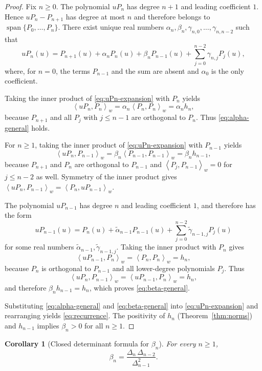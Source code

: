 \documentclass[11pt]{amsart}
\numberwithin{equation}{section}
\newtheorem{corollary}[theorem]{Corollary}
\theoremstyle{definition}
\newcommand{\DeltaH}[1]{\Delta_{#1}}
\newcommand{\inner}[2]{\left\langle #1,#2\right\rangle_{w}}
\begin{document}
\begin{proof}
Fix $n\ge 0$. The polynomial $uP_{n}$ has degree $n+1$ and leading coefficient
$1$. Hence $uP_{n}-P_{n+1}$ has degree at most $n$ and therefore belongs to
$\operatorname{span}\{P_{0},\dots,P_{n}\}$. There exist unique real numbers
$\alpha_{n},\beta_{n},\gamma_{n,0},\dots,\gamma_{n,n-2}$ such that
\begin{equation}\label{eq:uPn-expansion}
uP_{n}(u)=P_{n+1}(u)+\alpha_{n}P_{n}(u)
+\beta_{n}P_{n-1}(u)+\sum_{j=0}^{n-2}\gamma_{n,j}P_{j}(u),
\end{equation}
where, for $n=0$, the terms $P_{n-1}$ and the sum are absent and
$\alpha_{0}$ is the only coefficient.

Taking the inner product of \eqref{eq:uPn-expansion} with $P_{n}$ yields
\[
\inner{uP_{n}}{P_{n}}=\alpha_{n}\inner{P_{n}}{P_{n}}
=\alpha_{n}h_{n},
\]
because $P_{n+1}$ and all $P_{j}$ with $j\le n-1$ are orthogonal to $P_{n}$.
Thus \eqref{eq:alpha-general} holds.

For $n\ge 1$, taking the inner product of \eqref{eq:uPn-expansion} with
$P_{n-1}$ yields
\[
\inner{uP_{n}}{P_{n-1}}
=\beta_{n}\inner{P_{n-1}}{P_{n-1}}
=\beta_{n}h_{n-1},
\]
because $P_{n+1}$ and $P_{n}$ are orthogonal to $P_{n-1}$ and
$\inner{P_{j}}{P_{n-1}}=0$ for $j\le n-2$ as well. Symmetry of the inner
product gives $\inner{uP_{n}}{P_{n-1}}=\inner{P_{n}}{uP_{n-1}}$.

The polynomial $uP_{n-1}$ has degree $n$ and leading coefficient $1$, and
therefore has the form
\begin{equation}\label{eq:uPn-1}
uP_{n-1}(u)=P_{n}(u)+\widetilde{\alpha}_{n-1}P_{n-1}(u)
+\sum_{j=0}^{n-2}\widetilde{\gamma}_{n-1,j}P_{j}(u)
\end{equation}
for some real numbers $\widetilde{\alpha}_{n-1},\widetilde{\gamma}_{n-1,j}$.
Taking the inner product with $P_{n}$ gives
\[
\inner{uP_{n-1}}{P_{n}}=\inner{P_{n}}{P_{n}}=h_{n},
\]
because $P_{n}$ is orthogonal to $P_{n-1}$ and all lower-degree polynomials
$P_{j}$. Thus
\[
\inner{uP_{n}}{P_{n-1}}=\inner{uP_{n-1}}{P_{n}}=h_{n},
\]
and therefore $\beta_{n}h_{n-1}=h_{n}$, which proves \eqref{eq:beta-general}.

Substituting \eqref{eq:alpha-general} and \eqref{eq:beta-general} into
\eqref{eq:uPn-expansion} and rearranging yields \eqref{eq:recurrence}. The
positivity of $h_{n}$ (Theorem~\ref{thm:norms}) and $h_{n-1}$ implies
$\beta_{n}>0$ for all $n\ge 1$.
\end{proof}

\begin{corollary}[Closed determinant formula for $\beta_{n}$]\label{cor:beta-det}
For every $n\ge 1$,
\begin{equation}\label{eq:beta-det}
\beta_{n}=\frac{\DeltaH{n}\,\DeltaH{n-2}}{\DeltaH{n-1}^{2}}.
\end{equation}
\end{corollary}
\end{document}

